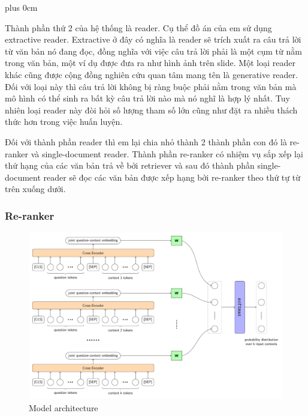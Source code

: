 \documentclass[11pt]{beamer}
\renewcommand{\raggedright}{\leftskip=0pt \rightskip=0pt plus 0cm}
\let\olditemize=\itemize
\renewenvironment{itemize}{\olditemize\raggedright}{\endlist}
\begin{document}
\begin{frame}
\begin{itemize}
\item {\fontsize{9pt}{\baselineskip}\selectfont Thành phần thứ 2 của hệ thống là reader. Cụ thể đồ án của em sử dụng extractive reader. Extractive ở đây có nghĩa là reader sẽ trích xuất ra câu trả lời từ văn bản nó đang đọc, đồng nghĩa với việc câu trả lời phải là một cụm từ nằm trong văn bản, một ví dụ được đưa ra như hình ảnh trên slide. Một loại reader khác cũng được cộng đồng nghiên cứu quan tâm mang tên là generative reader. Đối với loại này thì câu trả lời không bị ràng buộc phải nằm trong văn bản mà mô hình có thể sinh ra bất kỳ câu trả lời nào mà nó nghĩ là hợp lý nhất. Tuy nhiên loại reader này đòi hỏi số lượng tham số lớn cũng như đặt ra nhiều thách thức hơn trong việc huấn luyện.}
\item {\fontsize{9pt}{\baselineskip}\selectfont Đối với thành phần reader thì em lại chia nhỏ thành 2 thành phần con đó là re-ranker và single-document reader. Thành phần re-ranker có nhiệm vụ sắp xếp lại thứ hạng của các văn bản trả về bởi retriever và sau đó thành phần single-document reader sẽ đọc các văn bản được xếp hạng bởi re-ranker theo thứ tự từ trên xuống dưới.}
\end{itemize}
\end{frame}
\begin{frame}
	\frametitle{Re-ranker}
	\vspace*{-20pt}
	\begin{figure}[h]
		\includegraphics[scale=.43]{images/PDF/full-reranker/fullRerank.pdf}
		\caption{Model architecture}
	\end{figure}
\end{frame}
\end{document}
